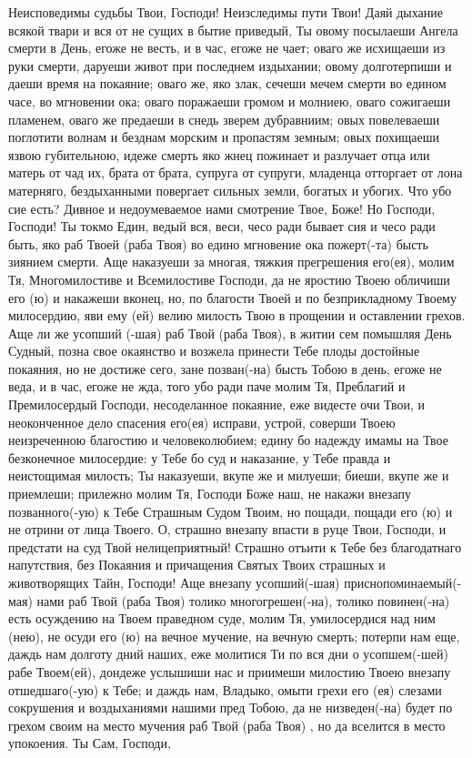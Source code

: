 \mychapterending{}

\begin{mymulticols}


Неисповедимы судьбы Твои, Господи! Неизследимы пути Твои! Даяй дыхание всякой твари и вся от не сущих в бытие приведый, Ты овому посылаеши Ангела смерти в День, егоже не весть, и в час, егоже не чает; оваго же исхищаеши из руки смерти, даруеши живот при последнем издыхании; овому долготерпиши и даеши время на покаяние; оваго же, яко злак, сечеши мечем смерти во едином часе, во мгновении ока; оваго поражаеши громом и молниею, оваго сожигаеши пламенем, оваго же предаеши в снедь зверем дубравниим; овых повелеваеши поглотити волнам и безднам морским и пропастям земным; овых похищаеши язвою губительною, идеже смерть яко жнец пожинает и разлучает отца или матерь от чад их, брата от брата, супруга от супруги, младенца отторгает от лона матерняго, бездыханными повергает сильных земли, богатых и убогих. Что убо сие есть? Дивное и недоумеваемое нами смотрение Твое, Боже! Но Господи, Господи! Ты токмо Един, ведый вся, веси, чесо ради бывает сия и чесо ради быть, яко раб Твоей (раба Твоя)  во едино мгновение ока пожерт(-та) бысть зиянием смерти. Аще наказуеши за многая, тяжкия прегрешения его(ея), молим Тя, Многомилостиве и Всемилостиве Господи, да не яростию Твоею обличиши его (ю) и накажеши вконец, но, по благости Твоей и по безприкладному Твоему милосердию, яви ему (ей) велию милость Твою в прощении и оставлении грехов. Аще ли же усопший (-шая) раб Твой (раба Твоя), в житии сем помышляя День Судный, позна свое окаянство и возжела принести Тебе плоды достойные покаяния, но не достиже сего, зане позван(-на) бысть Тобою в день, егоже не веда, и в час, егоже не жда, того убо ради паче молим Тя, Преблагий и Премилосердый Господи, несоделанное покаяние, еже видесте очи Твои, и неоконченное дело спасения его(ея) исправи, устрой, соверши Твоею неизреченною благостию и человеколюбием; едину бо надежду имамы на Твое безконечное милосердие: у Тебе бо суд и наказание, у Тебе правда и неистощимая милость; Ты наказуеши, вкупе же и милуеши; биеши, вкупе же и приемлеши; прилежно молим Тя, Господи Боже наш, не накажи внезапу позванного(-ую) к Тебе Страшным Судом Твоим, но пощади, пощади его (ю) и не отрини от лица Твоего. О, страшно внезапу впасти в руце Твои, Господи, и предстати на суд Твой нелицеприятный! Страшно отъити к Тебе без благодатнаго напутствия, без Покаяния и причащения Святых Твоих страшных и животворящих Тайн, Господи! Аще внезапу усопший(-шая) приснопоминаемый(-мая) нами раб Твой (раба Твоя) толико многогрешен(-на), толико повинен(-на) есть осуждению на Твоем праведном суде, молим Тя, умилосердися над ним (нею), не осуди его (ю) на вечное мучение, на вечную смерть; потерпи нам еще, даждь нам долготу дний наших, еже молитися Ти по вся дни о усопшем(-шей) рабе Твоем(ей), дондеже услышиши нас и приимеши милостию Твоею внезапу отшедшаго(-ую) к Тебе; и даждь нам, Владыко, омыти грехи его (ея) слезами сокрушения и воздыханиями нашими пред Тобою, да не низведен(-на) будет по грехом своим на место мучения раб Твой (раба Твоя) , но да вселится в место упокоения. Ты Сам, Господи, 
\end{mymulticols}
